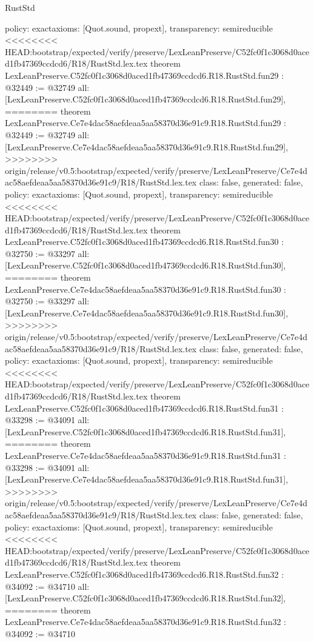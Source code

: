 \begin{lexlean}{RustStd}
\begin{coremodule}
{\begin{coremodule}
{{{{{{{{{{{{{{{{{{{{{{{{{{{{{{{{  policy: exact{axioms: [Quot.sound, propext]},
  transparency: semireducible
}
<<<<<<<< HEAD:bootstrap/expected/verify/preserve/LexLeanPreserve/C52fc0f1c3068d0aced1fb47369ccdcd6/R18/RustStd.lex.tex
theorem LexLeanPreserve.C52fc0f1c3068d0aced1fb47369ccdcd6.R18.RustStd.fun29 : @32449 := @32749 {
  all: [LexLeanPreserve.C52fc0f1c3068d0aced1fb47369ccdcd6.R18.RustStd.fun29],
========
theorem LexLeanPreserve.Ce7e4dac58aefdeaa5aa58370d36e91c9.R18.RustStd.fun29 : @32449 := @32749 {
  all: [LexLeanPreserve.Ce7e4dac58aefdeaa5aa58370d36e91c9.R18.RustStd.fun29],
>>>>>>>> origin/release/v0.5:bootstrap/expected/verify/preserve/LexLeanPreserve/Ce7e4dac58aefdeaa5aa58370d36e91c9/R18/RustStd.lex.tex
  class: false,
  generated: false,
  policy: exact{axioms: [Quot.sound, propext]},
  transparency: semireducible
}
<<<<<<<< HEAD:bootstrap/expected/verify/preserve/LexLeanPreserve/C52fc0f1c3068d0aced1fb47369ccdcd6/R18/RustStd.lex.tex
theorem LexLeanPreserve.C52fc0f1c3068d0aced1fb47369ccdcd6.R18.RustStd.fun30 : @32750 := @33297 {
  all: [LexLeanPreserve.C52fc0f1c3068d0aced1fb47369ccdcd6.R18.RustStd.fun30],
========
theorem LexLeanPreserve.Ce7e4dac58aefdeaa5aa58370d36e91c9.R18.RustStd.fun30 : @32750 := @33297 {
  all: [LexLeanPreserve.Ce7e4dac58aefdeaa5aa58370d36e91c9.R18.RustStd.fun30],
>>>>>>>> origin/release/v0.5:bootstrap/expected/verify/preserve/LexLeanPreserve/Ce7e4dac58aefdeaa5aa58370d36e91c9/R18/RustStd.lex.tex
  class: false,
  generated: false,
  policy: exact{axioms: [Quot.sound, propext]},
  transparency: semireducible
}
<<<<<<<< HEAD:bootstrap/expected/verify/preserve/LexLeanPreserve/C52fc0f1c3068d0aced1fb47369ccdcd6/R18/RustStd.lex.tex
theorem LexLeanPreserve.C52fc0f1c3068d0aced1fb47369ccdcd6.R18.RustStd.fun31 : @33298 := @34091 {
  all: [LexLeanPreserve.C52fc0f1c3068d0aced1fb47369ccdcd6.R18.RustStd.fun31],
========
theorem LexLeanPreserve.Ce7e4dac58aefdeaa5aa58370d36e91c9.R18.RustStd.fun31 : @33298 := @34091 {
  all: [LexLeanPreserve.Ce7e4dac58aefdeaa5aa58370d36e91c9.R18.RustStd.fun31],
>>>>>>>> origin/release/v0.5:bootstrap/expected/verify/preserve/LexLeanPreserve/Ce7e4dac58aefdeaa5aa58370d36e91c9/R18/RustStd.lex.tex
  class: false,
  generated: false,
  policy: exact{axioms: [Quot.sound, propext]},
  transparency: semireducible
}
<<<<<<<< HEAD:bootstrap/expected/verify/preserve/LexLeanPreserve/C52fc0f1c3068d0aced1fb47369ccdcd6/R18/RustStd.lex.tex
theorem LexLeanPreserve.C52fc0f1c3068d0aced1fb47369ccdcd6.R18.RustStd.fun32 : @34092 := @34710 {
  all: [LexLeanPreserve.C52fc0f1c3068d0aced1fb47369ccdcd6.R18.RustStd.fun32],
========
theorem LexLeanPreserve.Ce7e4dac58aefdeaa5aa58370d36e91c9.R18.RustStd.fun32 : @34092 := @34710 {
}}}}}}}}}}}}}}}}}}}}}}}}}}}}}}}}}}}}
\end{coremodule}}
\end{coremodule}
\end{lexlean}
